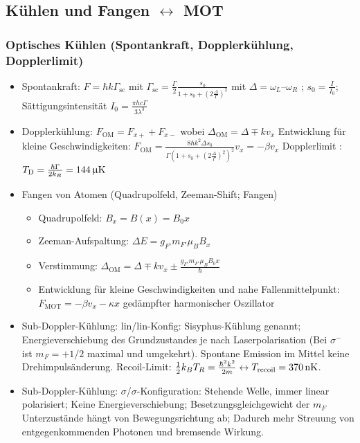 \documentclass[10pt,a4paper]{extarticle}
\begin{document}
\subsection*{Kühlen und Fangen $\leftrightarrow$ MOT}
\subsubsection*{Optisches Kühlen (Spontankraft, Dopplerkühlung, Dopplerlimit)}
\begin{itemize}
\item Spontankraft: $F = \hbar k \Gamma_{\text{sc}}$ mit $\Gamma_{\text{sc}} =  \frac{\Gamma}{2} \frac{s_0}{1+s_0+\left(2\frac{\Delta}{\Gamma}\right)^2}$ mit $\Delta = \omega_L – \omega_R$ ; $s_0= \frac{I}{I_0}$; Sättigungsintensität $I_0=\frac{\pi h c \Gamma}{3\lambda^3}$
\item Dopplerkühlung: $F_{\text{OM}} = F_{x+} + F_{x-}$ wobei $\Delta_{\text{OM}} = \Delta \mp k v_x$
Entwicklung für kleine Geschwindigkeiten: $F_{\text{OM}} = \frac{8 \hbar k^2 \Delta s_0}{\Gamma \left(1+s_0 + \left(2 \frac{\Delta}{\Gamma}\right)^2\right)^2} v_x = -\beta v_x $
Dopplerlimit : $T_{\text{D}} = \frac{\hbar \Gamma}{2 k_B} = \unit[144]{\upmu K}$
\item Fangen von Atomen (Quadrupolfeld, Zeeman-Shift; Fangen)
\begin{itemize}
\item Quadrupolfeld:  $B_x = B(x) = B_0 x$
\item Zeeman-Aufspaltung: $\Delta E = g_{F'} m_{F'} \mu_B B_x$
\item Verstimmung: $\Delta_{\text{OM}} = \Delta \mp k v_x \pm \frac{g_{F'} m_{F'} \mu_B B_0 x}{\hbar}$
\item Entwicklung für kleine Geschwindigkeiten und nahe Fallenmittelpunkt: $F_{\text{MOT}} = - \beta v_x - \kappa x$ gedämpfter harmonischer Oszillator
\end{itemize}
\item Sub-Doppler-Kühlung: lin/lin-Konfig: Sisyphus-Kühlung genannt; Energieverschiebung des Grundzustandes je nach Laserpolarisation (Bei $\sigma^-$ ist $m_F=+1/2$ maximal und umgekehrt). Spontane Emission im Mittel keine Drehimpulsänderung. Recoil-Limit: $\frac{1}{2} k_B T_R = \frac{\hbar^2 k^2}{2m} \leftrightarrow T_{\mathrm{recoil}} = \unit[370]{nK}$.
\item Sub-Doppler-Kühlung: $\sigma$/$\sigma$-Konfiguration: Stehende Welle, immer linear polarisiert; Keine Energieverschiebung; Besetzungsgleichgewicht der $m_F$ Unterzustände hängt von Bewegungsrichtung ab; Dadurch mehr Streuung von entgegenkommenden Photonen und bremsende Wirkung.
\end{itemize}
\end{document}
